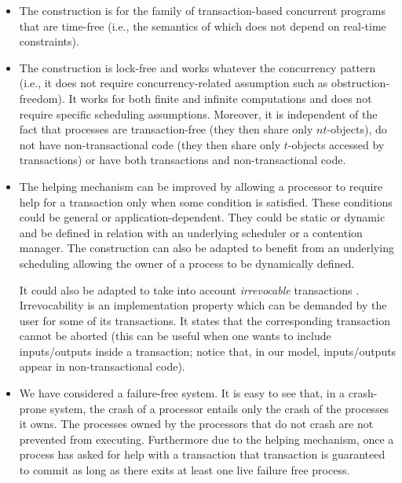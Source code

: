 \begin{itemize}

\item  The construction is for the family of transaction-based concurrent
programs  that are time-free (i.e., the semantics of which does not depend 
on real-time constraints). 

\item 
The construction  is lock-free and  works whatever the concurrency pattern
(i.e., it does not require concurrency-related  assumption such as 
obstruction-freedom). It  works for  both finite  and  infinite
computations and does not require  specific scheduling assumptions.  
%
Moreover,  it is  independent of the fact that 
processes  are  transaction-free (they then share  only
$nt$-objects),  do not have  non-transactional code (they then  share 
only $t$-objects  accessed by transactions)  or have both  transactions and
non-transactional code.  

\item  
The helping mechanism can be improved by allowing a processor to 
require help for a transaction only when  some condition is satisfied. 
These  conditions could be general or application-dependent. They could 
be static or dynamic and  be  defined in relation with an underlying
scheduler or a contention manager. 
The construction can also be  adapted  to benefit from an underlying 
scheduling allowing the owner of a process to be  dynamically defined.  

It could also be adapted to  take into account {\it irrevocable} transactions
\cite{SSDMS08,WSA08}. 
Irrevocability is an implementation property which can be 
demanded by the user for  some of its transactions. It states that 
the corresponding transaction cannot be aborted (this can be useful when 
one wants to include inputs/outputs inside a transaction; notice that, 
in our model, inputs/outputs appear in non-transactional code). 

\item  
We have considered a failure-free system. It is easy to see that, in a
 crash-prone system, the crash of a processor entails only the
crash of the processes it owns.  The processes owned by the processors that
do not crash are not prevented from executing.
Furthermore due to the helping mechanism, once a process has asked
for help with a transaction that transaction is guaranteed to commit
as long as there exits at least one live failure free process.
\end{itemize}

